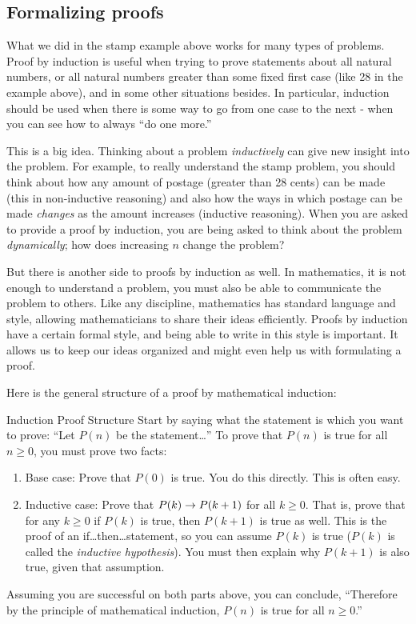 \documentclass[12pt]{article}
\begin{document}
\subsection{Formalizing proofs}

What we did in the stamp example above works for many types of problems.  Proof by induction is useful when trying to prove statements about all natural numbers, or all natural numbers greater than some fixed first case (like 28 in the example above), and in some other situations besides.  In particular, induction should be used when there is some way to go from one case to the next - when you can see how to always ``do one more.''

This is a big idea.  Thinking about a problem {\em inductively} can give new insight into the problem.  For example, to really understand the stamp problem, you should think about how any amount of postage (greater than 28 cents) can be made (this in non-inductive reasoning) and also how the ways in which postage can be made {\em changes} as the amount increases (inductive reasoning).  When you are asked to provide a proof by induction, you are being asked to think about the problem {\em dynamically}; how does increasing $n$ change the problem?  

But there is another side to proofs by induction as well.  In mathematics, it is not enough to understand a problem, you must also be able to communicate the problem to others.  Like any discipline, mathematics has standard language and style, allowing mathematicians to share their ideas efficiently.  Proofs by induction have a certain formal style, and being able to write in this style is important.  It allows us to keep our ideas organized and might even help us with formulating a proof.

Here is the general structure of a proof by mathematical induction:

\begin{defbox}{Induction Proof Structure}
Start by saying what the statement is which you want to prove: ``Let $P(n)$ be the statement\ldots''
To prove that $P(n)$ is true for all $n \ge 0$, you must prove two facts:

\begin{enumerate}
  \item Base case: Prove that $P(0)$ is true.  You do this directly.  This is often easy.
  \item Inductive case: Prove that $P(k) \rightarrow P(k+1)$ for all $k \ge 0$.  That is, prove that for any $k \ge 0$ if $P(k)$ is true, then $P(k+1)$ is true as well.  This is the proof of an if\ldots then\ldots statement, so you can assume $P(k)$ is true ($P(k)$ is called the {\em inductive hypothesis}).  You must then explain why $P(k+1)$ is also true, given that assumption.  
\end{enumerate}

Assuming you are successful on both parts above, you can conclude, ``Therefore by the principle of mathematical induction, $P(n)$ is true for all $n \ge 0$.''
\end{defbox}
\end{document}
